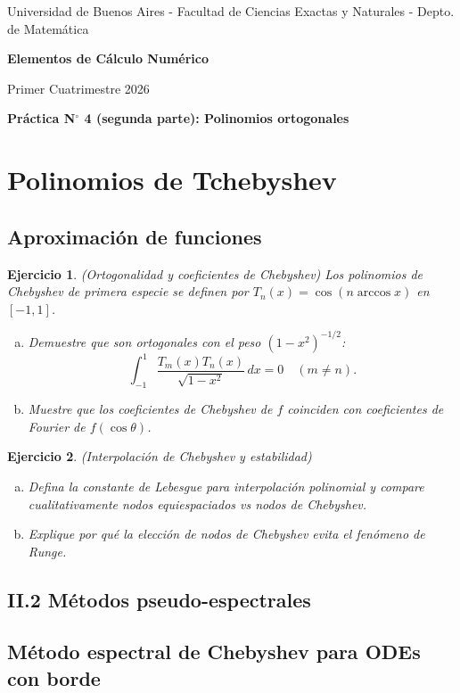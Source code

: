 \documentclass[12pt]{article}
\newtheorem{exercise}{Ejercicio}
\newcommand{\bej}{\begin{exercise}\rm}
\newcommand{\fej}{\end{exercise}}
\begin{document}
\centerline{{\small Universidad de Buenos Aires - Facultad de Ciencias Exactas y Naturales - Depto. de Matemática}}
 
 \vskip 0.2cm
 \hrulefill
 \vskip 0.2cm

 \centerline{{\bf\Huge {\sc Elementos de Cálculo Numérico}}}
 \vskip 0.2cm
 \centerline{\ttfamily Primer Cuatrimestre 2026}
 \hrulefill

 \bigskip
 \centerline{\bf Práctica N$^\circ$ 4 (segunda parte): Polinomios ortogonales}
 \bigskip

\section*{Polinomios de Tchebyshev}

\subsection*{Aproximación de funciones}

\bej
(Ortogonalidad y coeficientes de Chebyshev)
Los polinomios de Chebyshev de primera especie se definen por $T_n(x)=\cos(n\arccos x)$ en $[-1,1]$.
\begin{enumerate}[(a)]
    \item Demuestre que son ortogonales con el peso $(1-x^2)^{-1/2}$:
    \[
    \int_{-1}^{1}\frac{T_m(x)T_n(x)}{\sqrt{1-x^2}}\,dx=0\quad (m\neq n).
    \]
    \item Muestre que los coeficientes de Chebyshev de $f$ coinciden con coeficientes de Fourier de $f(\cos\theta)$.
\end{enumerate}
\fej

\bej
(Interpolación de Chebyshev y estabilidad)
\begin{enumerate}[(a)]
    \item Defina la constante de Lebesgue para interpolación polinomial y compare cualitativamente nodos equiespaciados vs nodos de Chebyshev.
    \item Explique por qué la elección de nodos de Chebyshev evita el fenómeno de Runge.
\end{enumerate}
\fej

\subsection*{II.2 Métodos pseudo-espectrales}

\subsection*{Método espectral de Chebyshev para ODEs con borde}
\end{document}
